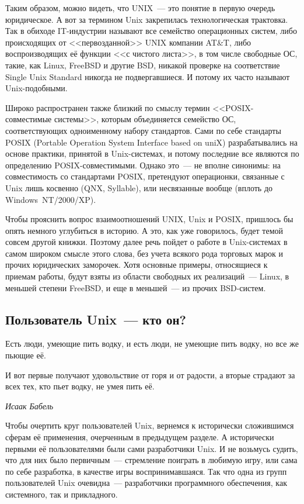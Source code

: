 Таким образом, можно видеть, что UNIX~--- это понятие в первую очередь юридическое. А вот за термином Unix закрепилась технологическая трактовка. Так в обиходе IT-индустрии называют все семейство операционных систем, либо происходящих от <<первозданной>> UNIX компании AT\&T, либо воспроизводящих её функции <<с чистого листа>>, в том числе свободные ОС, такие, как Linux, FreeBSD и другие BSD, никакой проверке на соответствие Single Unix Standard никогда не подвергавшиеся. И потому их часто называют Unix-подобными.

Широко распространен также близкий по смыслу термин <<POSIX-совместимые системы>>, которым объединяется семейство ОС, соответствующих одноименному набору стандартов. Сами по себе стандарты POSIX (Portable Operation System Interface based on uniX) разрабатывались на основе практики, принятой в Unix-системах, и потому последние все являются по определению POSIX-совместимыми. Однако это~--- не вполне синонимы: на совместимость со стандартами POSIX, претендуют операционки, связанные с Unix лишь косвенно (QNX, Syllable), или несвязанные вообще (вплоть до Windows~NT/2000/XP).

Чтобы прояснить вопрос взаимоотношений UNIX, Unix и POSIX, пришлось бы опять немного углубиться в историю. А это, как уже говорилось, будет темой совсем другой книжки. Поэтому далее речь пойдет о работе в Unix-системах в самом широком смысле этого слова, без учета всякого рода торговых марок и прочих юридических заморочек. Хотя основные примеры, относящиеся к приемам работы, будут взяты из области свободных их реализаций~--- Linux, в меньшей степени FreeBSD, и еще в меньшей~--- из прочих BSD-систем.

\subsection{Пользователь Unix~--- кто он?}

\hfill \begin{minipage}[h]{0.45\textwidth}
Есть люди, умеющие пить водку, и есть люди, не умеющие пить водку, но все же пьющие её. 

И вот первые получают удовольствие от горя и от радости, а вторые страдают за всех тех, кто пьет водку, не умея пить её. 
\begin{flushright}
\textit{Исаак Бабель}
\end{flushright}
\bigskip\end{minipage}

Чтобы очертить круг пользователей Unix, вернемся к исторически сложившимся сферам её применения, очерченным в предыдущем разделе. А исторически первыми её пользователями были сами разработчики Unix. И не возьмусь судить, что для них было первичным~--- стремление поиграть в любимую игру, или сама по себе разработка, в качестве игры воспринимавшаяся. Так что одна из групп пользователей Unix очевидна~--- разработчики программного обеспечения, как системного, так и прикладного.

